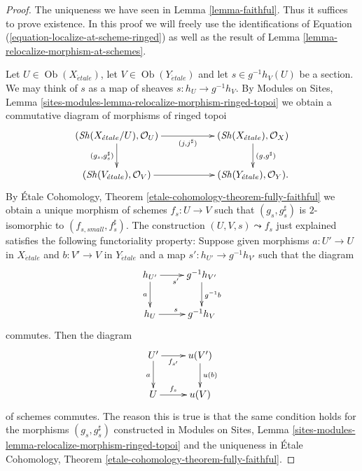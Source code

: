 \documentclass{stacks-project}
\theoremstyle{plain}
\theoremstyle{definition}
\theoremstyle{remark}
\numberwithin{equation}{subsection}
\def\Ob{\mathop{\mathrm{Ob}}\nolimits}
\def\Sh{\mathop{\mathit{Sh}}\nolimits}
\def\etale{{\acute{e}tale}}
\begin{document}
\begin{proof}
The uniqueness we have seen in
Lemma \ref{lemma-faithful}.
Thus it suffices to prove existence.
In this proof we will freely use the identifications of
Equation (\ref{equation-localize-at-scheme-ringed})
as well as the result of
Lemma \ref{lemma-relocalize-morphism-at-schemes}.

\medskip\noindent
Let $U \in \Ob(X_\etale)$, let
$V \in \Ob(Y_\etale)$
and let $s \in g^{-1}h_V(U)$ be a section. We may think of
$s$ as a map of sheaves $s : h_U \to g^{-1}h_V$. By
Modules on Sites,
Lemma \ref{sites-modules-lemma-relocalize-morphism-ringed-topoi}
we obtain a commutative diagram of morphisms of ringed topoi
$$
\xymatrix{
(\Sh(X_\etale/U), \mathcal{O}_U)
\ar[rr]_-{(j, j^\sharp)} \ar[d]_{(g_s, g_s^\sharp)} & &
(\Sh(X_\etale), \mathcal{O}_X) \ar[d]^{(g, g^\sharp)} \\
(\Sh(V_\etale), \mathcal{O}_V) \ar[rr] & &
(\Sh(Y_\etale), \mathcal{O}_Y).
}
$$
By
\'Etale Cohomology, Theorem \ref{etale-cohomology-theorem-fully-faithful}
we obtain a unique morphism of schemes $f_s : U \to V$ such that
$(g_s, g_s^\sharp)$ is $2$-isomorphic to $(f_{s, small}, f_s^\sharp)$.
The construction $(U, V, s) \leadsto f_s$ just explained satisfies
the following functoriality property: Suppose given morphisms
$a : U' \to U$ in $X_\etale$ and $b : V' \to V$ in $Y_\etale$
and a map $s' : h_{U'} \to g^{-1}h_{V'}$ such that the diagram
$$
\xymatrix{
h_{U'} \ar[d]_a \ar[r]_{s'} & g^{-1}h_{V'} \ar[d]^{g^{-1}b} \\
h_U \ar[r]^s & g^{-1}h_V
}
$$
commutes. Then the diagram
$$
\xymatrix{
U' \ar[r]_-{f_{s'}} \ar[d]_a & u(V') \ar[d]^{u(b)} \\
U \ar[r]^-{f_s} & u(V)
}
$$
of schemes commutes. The reason this is true is that the same condition
holds for the morphisms $(g_s, g_s^\sharp)$ constructed in
Modules on Sites,
Lemma \ref{sites-modules-lemma-relocalize-morphism-ringed-topoi}
and the uniqueness in
\'Etale Cohomology, Theorem \ref{etale-cohomology-theorem-fully-faithful}.


\end{proof}
\end{document}
